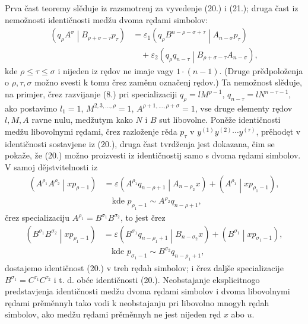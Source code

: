 \documentclass[11pt]{article}
\newcommand{\pair}[2]{\left(#1\middle|#2\right)}
\newcommand{\eps}{\varepsilon}
\begin{document}
Prva čast teoremy slěduje iz razsmotrenj za vyvedenje (20.) i (21.); druga čast iz nemožnosti identičnosti medžu dvoma rędami simbolov:
\[
\begin{aligned}
\pair{q_\rho A^\sigma}{B_{\rho+\sigma-\tau}p_\tau}
&=\eps_1\pair{q_\rho B^{n-\rho-\sigma+\tau}}{A_{n-\sigma}p_\tau}\\
&\quad+\eps_2\pair{q_\rho q_{n-\tau}}{B_{\rho+\sigma-\tau}A_{n-\sigma}},
\end{aligned}
\]
kde $\rho\le\tau\le\sigma$ i nijeden iz rędov ne imaje vagy $1\cdot(n-1)$. (Druge prědpoloženja o $\rho,\tau,\sigma$ možno svesti k tomu črez zaměnu označenj rędov.) Ta nemožnost slěduje, na primjer, črez razvijanje (8.) pri specializaciji $q_\rho=lM^{\rho-1}$, $q_{n-\tau}=lN^{n-\tau-1}$, ako postavimo $l_1=1$, $M^{2,3,\ldots,\rho}=1$, $A^{\rho+1,\ldots,\rho+\sigma}=1$, vse druge elementy rędov $l,M,A$ ravne nulu, medžutym kako $N$ i $B$ sut libovolne. Poněže identičnosti medžu libovolnymi rędami, črez razloženje rěda $p_\tau$ v $y^{(1)}y^{(2)}\cdots y^{(\tau)}$, prěhodęt v identičnosti sostavjene iz (20.), druga čast tvrdženja jest dokazana, čim se pokaže, že (20.) možno proizvesti iz identičnostij samo s dvoma rędami simbolov. V samoj dějstvitelnosti iz
\begin{equation}
\begin{aligned}
\pair{A^{\rho_1}A^{\rho_2}}{xp_{\rho-1}}
&=\eps\pair{A^{\rho_1}q_{n-\rho+1}}{A_{n-\rho_2}x}
+\pair{A^{\rho_1}}{xp_{\rho_1-1}},\\
&\quad \text{kde }p_{\rho_1-1}\sim A^{\rho_2}q_{n-\rho+1},
\end{aligned}
\tag{20a}
\end{equation}
črez specializaciju $A^{\rho_1}=B^{\sigma_1}B^{\sigma_2}$, to jest črez
\[
\begin{aligned}
\pair{B^{\sigma_1}B^{\sigma_2}}{xp_{\rho_1-1}}
&=\eps\pair{B^{\sigma_1}q_{n-\rho_1+1}}{B_{n-\sigma_2}x}
+\pair{B^{\sigma_1}}{xp_{\sigma_1-1}},\\
&\quad \text{kde } p_{\sigma_1-1}\sim B^{\sigma_2}q_{n-\rho_1+1},
\end{aligned}
\]
dostajemo identičnost (20.) v treh rędah simbolov; i črez daljše specializacije $B^{\sigma_1}=C^{\tau_1}C^{\tau_2}$ i t. d. obće identičnosti (20.). Neobstajanje eksplicitnogo predstavjenja identičnosti medžu dvoma rędami simbolov i dvoma libovolnymi rędami prěměnnyh tako vodi k neobstajanju pri libovolno mnogyh rędah simbolov, ako medžu rędami prěměnnyh ne jest nijeden ręd $x$ abo $u$.
\end{document}
